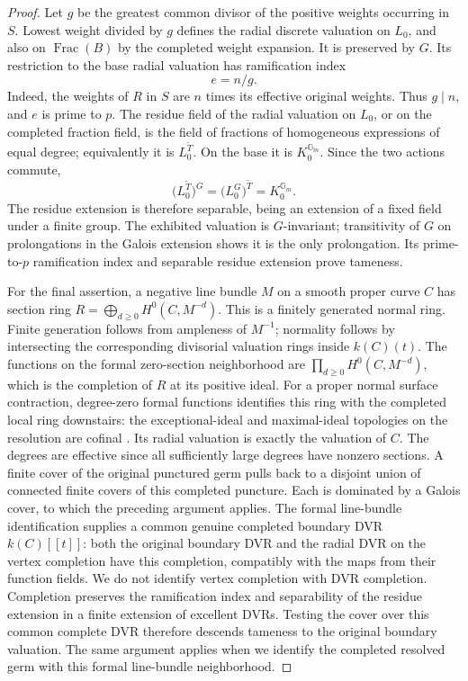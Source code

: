 \begin{proof}
Let $g$ be the greatest common divisor of the positive weights
occurring in $S$.  Lowest weight divided by $g$ defines the
radial discrete valuation on $L_0$, and also on
$\operatorname{Frac}(B)$ by the completed weight expansion.
It is preserved by $G$.  Its restriction to the base radial
valuation has ramification index
\[
 e=n/g.
\]
Indeed, the weights of $R$ in $S$ are $n$ times its effective
original weights.  Thus $g\mid n$, and $e$ is prime to $p$.
The residue field of the radial valuation on $L_0$, or on the
completed fraction field, is the field of fractions of
homogeneous expressions of equal degree; equivalently it is
$L_0^{\widetilde T}$.  On the base it is
$K_0^{\mathbb G_m}$.  Since the two actions commute,
\[
 \bigl(L_0^{\widetilde T}\bigr)^G
   =\bigl(L_0^G\bigr)^{\widetilde T}
   =K_0^{\mathbb G_m}.
\]
The residue extension is therefore separable, being an extension
of a fixed field under a finite group.  The exhibited valuation
is $G$-invariant; transitivity of $G$ on prolongations in the
Galois extension shows it is the only prolongation.  Its
prime-to-$p$ ramification index and separable residue extension
prove tameness.

For the final assertion, a negative line bundle $M$ on a smooth
proper curve $C$ has section ring
$R=\bigoplus_{d\geq0}H^0(C,M^{-d})$.  This is a finitely
generated normal ring.  Finite generation follows from ampleness
of $M^{-1}$; normality follows by intersecting the corresponding
divisorial valuation rings inside $k(C)(t)$.  The functions on
the formal zero-section neighborhood are
$\prod_{d\geq0}H^0(C,M^{-d})$, which is the completion of $R$
at its positive ideal.  For a proper normal surface contraction,
degree-zero formal functions identifies this ring with the
completed local ring downstairs: the exceptional-ideal and
maximal-ideal topologies on the resolution are cofinal
\cite[Theorem 30.20.5, tag 02OC]{C_StacksFormalPic}.
Its radial valuation is exactly the valuation of $C$.
The degrees are effective since all sufficiently large degrees
have nonzero sections.  A finite cover of the original
punctured germ pulls back to a disjoint union of connected
finite covers of this completed puncture.  Each is dominated
by a Galois cover, to which the preceding argument applies.
The formal line-bundle identification supplies a common genuine
completed boundary DVR $k(C)[[t]]$: both the original boundary
DVR and the radial DVR on the vertex completion have this
completion, compatibly with the maps from their function fields.
We do not identify vertex completion with DVR completion.
Completion preserves the ramification index and separability
of the residue extension in a finite extension of excellent
DVRs.  Testing the cover over this common complete DVR therefore
descends tameness to the original boundary valuation.
The same argument applies when
we identify the completed resolved germ with this formal
line-bundle neighborhood.
\end{proof}
